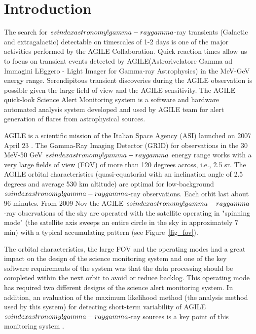 \section{Introduction}
The search for $\\ssindex{astronomy!gamma-ray}gamma$-ray transients (Galactic and extragalactic) detectable on timescales of 1-2 days is one of the major activities performed by the AGILE Collaboration. Quick reaction times allow us to focus on transient events detected by AGILE(Astrorivelatore Gamma ad Immagini LEggero - Light Imager for Gamma-ray Astrophysics) in the MeV-GeV energy range. Serendipitous transient discoveries during the AGILE observation is possible given the large field of view and the AGILE sensitivity. The AGILE quick-look Science Alert Monitoring system  is a software and hardware automated analysis system developed and used by AGILE team for alert generation of flares from astrophysical sources.

AGILE is a scientific mission of the Italian Space Agency (ASI) launched on 2007 April 23 \citep{Tavani:2009ht}. The Gamma-Ray Imaging Detector (GRID) for observations in the 30 MeV-50 GeV $\\ssindex{astronomy!gamma-ray}gamma$ energy range works with a very large fields of view (FOV) of more than 120 degrees across, i.e., 2.5 sr. The AGILE orbital characteristics (quasi-equatorial with an inclination angle of 2.5 degrees and average 530 km altitude) are optimal for low-background  $\\ssindex{astronomy!gamma-ray}gamma$-ray observations. Each orbit last about 96 minutes. From 2009 Nov the AGILE $\\ssindex{astronomy!gamma-ray}gamma$-ray observations of the sky are operated  with the satellite operating in "spinning mode" (the satellite axis sweeps an entire circle in the sky in approximately 7 min) with a typical accumulating pattern (see Figure~\ref{fig_fov}).            

The orbital characteristics, the large FOV and the operating modes had a great impact on the design of the science monitoring system and one of the key software requirements of the system was that the data processing should be completed within the next orbit to avoid or reduce backlog. This operating mode has required two different designs of the science alert monitoring system. In addition, an evaluation of the maximum likelihood method (the analysis method used by this system) for detecting short-term variability of AGILE $\\ssindex{astronomy!gamma-ray}gamma$-ray sources is a key point of this monitoring system \citep{Bulgarelli:2012ds}.
                   
